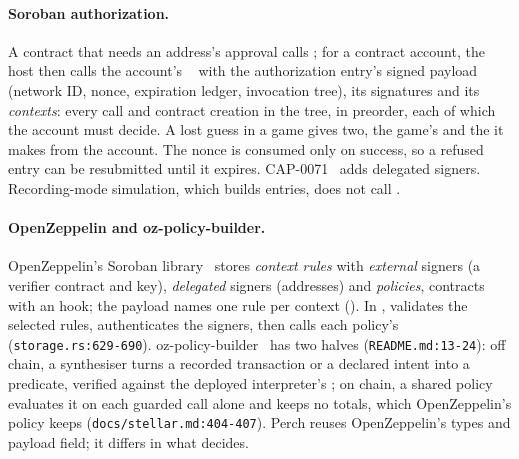 \paragraph{Soroban authorization.} A contract that needs an address's approval
calls ; for a contract account, the host then calls the
account's ~\cite{cap-0046-11,stellar-custom-account} with
the authorization entry's signed payload (network ID, nonce, expiration ledger,
invocation tree), its signatures and its \emph{contexts}: every call and
contract creation in the tree, in preorder, each of which the account must
decide. A lost guess in a game gives two, the game's  and the
 it makes from the account. The nonce is consumed only on
success, so a refused entry can be resubmitted until it expires.
CAP-0071~\cite{cap-0071} adds delegated signers. Recording-mode simulation,
which builds entries, does not call .

\paragraph{OpenZeppelin and oz-policy-builder.} OpenZeppelin's Soroban
library~\cite{oz-stellar-accounts} stores \emph{context rules} with
\emph{external} signers (a verifier contract and key), \emph{delegated} signers
(addresses) and \emph{policies}, contracts with an  hook; the
payload names one rule per context (). In
,  validates the selected rules,
authenticates the signers, then calls each policy's 
(\nolinkurl{storage.rs:629-690}). oz-policy-builder~\cite{oz-policy-builder} has two
halves (\nolinkurl{README.md:13-24}): off chain, a synthesiser turns a recorded
transaction or a declared intent into a predicate, verified against the deployed
interpreter's ; on chain, a shared  policy
evaluates it on each guarded call alone and keeps no totals, which OpenZeppelin's
 policy keeps (\nolinkurl{docs/stellar.md:404-407}). Perch
reuses OpenZeppelin's types and payload field; it differs in what decides.

